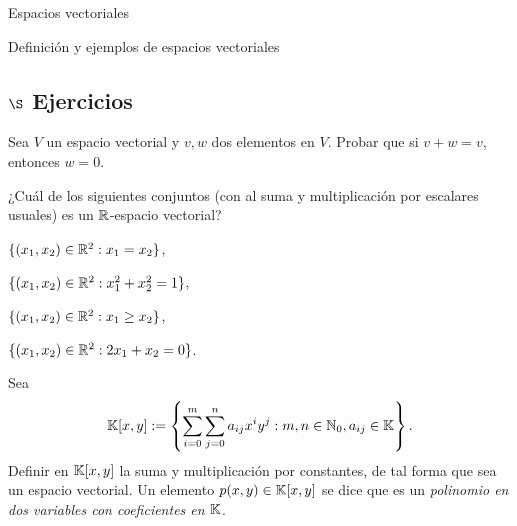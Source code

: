 \begin{chapter}{Espacios vectoriales}
\begin{section}{Definici\'on y ejemplos de espacios vectoriales}
            \subsection*{$\S$ Ejercicios}
            \begin{enumex}
                \item Sea $V$  un espacio vectorial y $v,w$  dos elementos en $V$. Probar que si $v+w =v$,  entonces $w=0$.
                \item ¿Cuál de los siguientes conjuntos (con al suma y multiplicación por escalares usuales)  es un $\mathbb R$-espacio vectorial?
                \begin{multicols}{2}
                    \begin{enumex}
                        \item $\{(x_1,x_2)\in\mathbb R^2: x_1=x_2 \}$,
                        \item $\{(x_1,x_2)\in\mathbb R^2: x_1^2 + x_2^2 = 1 \}$,
                        \item $\{(x_1,x_2)\in\mathbb R^2: x_1 \ge x_2\}$,
                        \item $\{(x_1,x_2)\in\mathbb R^2: 2x_1 +x_2 =0\}$.
                    \end{enumex}
                    
                \end{multicols}
                \item\label{ejercicio-polinomios-en-2-variables} Sea
                $$
                \mathbb K[x,y] := \left\{\sum_{i=0}^m\sum_{j=0}^n a_{ij}x^iy^j: m,n \in \mathbb N_0, a_{ij} \in \mathbb K\right\}.
                $$ 
                Definir en $\mathbb K[x,y]$ la suma y multiplicación por constantes, de tal forma que sea un espacio vectorial. Un  elemento $p(x,y) \in \mathbb K[x,y]$ se dice que es un  \textit{polinomio en dos variables con coeficientes en $\mathbb K$}.


\end{enumex}
\end{section}
\end{chapter}
